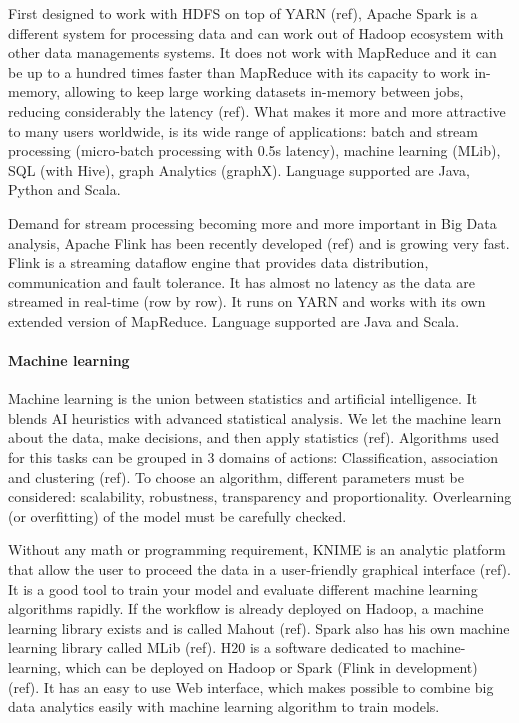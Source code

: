 First designed to work with HDFS on top of YARN (ref), Apache Spark is a different system for processing data and can work out of Hadoop ecosystem with other data managements systems.
It does not work with MapReduce and it can be up to a hundred times faster than MapReduce with its capacity to work in-memory, allowing to keep large working datasets in-memory between jobs, reducing considerably the latency (ref).
What makes it more and more attractive to many users worldwide, is its wide range of applications: batch and stream processing (micro-batch processing with 0.5s latency), machine learning (MLib), SQL (with Hive), graph Analytics (graphX).
Language supported are Java, Python and Scala.

Demand for stream processing becoming more and more important in Big Data analysis, Apache Flink has been recently developed (ref) and is growing very fast.
Flink is a streaming dataflow engine that provides data distribution, communication and fault tolerance.
It has almost no latency as the data are streamed in real-time (row by row).
It runs on YARN and works with its own extended version of MapReduce. Language supported are Java and Scala.

\paragraph{Machine learning}

Machine learning is the union between statistics and artificial intelligence.
It blends AI heuristics with advanced statistical analysis.
We let the machine learn about the data, make decisions, and then apply statistics (ref).
Algorithms used for this tasks can be grouped in 3 domains of actions: Classification, association and clustering (ref).
To choose an algorithm, different parameters must be considered: scalability, robustness, transparency and proportionality.
Overlearning (or overfitting) of the model must be carefully checked.

Without any math or programming requirement, KNIME is an analytic platform that allow the user to proceed the data in a user-friendly graphical interface (ref).
It is a good tool to train your model and evaluate different machine learning algorithms rapidly.
If the workflow is already deployed on Hadoop, a machine learning library exists and is called Mahout (ref).
Spark also has his own machine learning library called MLib (ref).
H20 is a software dedicated to machine-learning, which can be deployed on Hadoop or Spark (Flink in development) (ref).
It has an easy to use Web interface, which makes possible to combine big data analytics easily with machine learning algorithm to train models.

